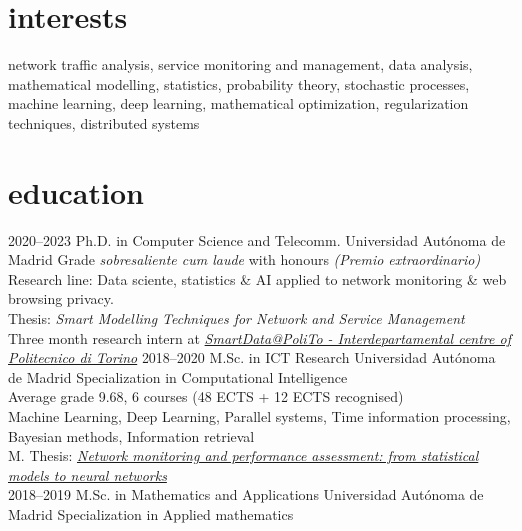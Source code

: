 \documentclass[]{friggeri-cv}
\begin{document}
\section{interests}

network traffic analysis, service monitoring and management, data analysis, mathematical modelling, statistics, probability theory, stochastic processes, machine learning, deep learning, mathematical optimization, regularization techniques, distributed systems

\section{education}

\begin{entrylist}
\entry
    {2020–2023}
    {Ph.D. in Computer Science and Telecomm.}
    {Universidad Autónoma de Madrid}
    {Grade \textit{sobresaliente cum laude} with honours \emph{(Premio extraordinario)}\\
    Research line: Data sciente, statistics \& AI applied to network monitoring \& web browsing privacy.\\
    Thesis: \emph{Smart Modelling Techniques for Network and Service Management}\\
    Three month research intern at \href{https://smartdata.polito.it/}{\emph{SmartData@PoliTo - Interdepartamental centre of Politecnico di Torino}}
    }
\entry
    {2018–2020}
    {M.Sc. in ICT Research}
    {Universidad Autónoma de Madrid}
    {Specialization in Computational Intelligence\\
    Average grade 9.68, 6 courses (48 ECTS + 12 ECTS recognised) \\
    Machine Learning, Deep Learning, Parallel systems, Time information processing, Bayesian methods, Information retrieval \\
    M. Thesis: \href{https://repositorio.uam.es/bitstream/handle/10486/692579/perdices_burrero_daniel_tfm.pdf?sequence=1&isAllowed=y}{\emph{Network monitoring and performance assessment: from statistical models to neural networks}}\\%
    }
  \entry
    {2018–2019}
    {M.Sc. in Mathematics and Applications}
    {Universidad Autónoma de Madrid}
    {Specialization in Applied mathematics\\
}
\end{entrylist}
\end{document}
